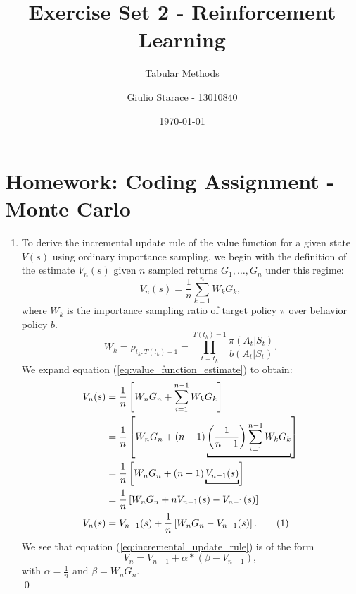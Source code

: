 \documentclass{article}
\title{Exercise Set 2 - Reinforcement Learning}
\subtitle{Tabular Methods}
\author{Giulio Starace - 13010840}
\date{\today}
\newcommand\numberthis{\addtocounter{equation}{1}\tag{\theequation}}
\begin{document}
\maketitle
\section*{Homework: Coding Assignment - Monte Carlo}
\begin{enumerate}
	\item To derive the incremental update rule of the value function for a given state $V(s)$ using
	      ordinary importance sampling, we begin with the definition of the estimate $V_n(s)$ given $n$
	      sampled returns $G_1, \dots, G_n$ under this regime:
	      \begin{equation}\label{eq:value_function_estimate}
		      V_n(s) = \frac{1}{n} \sum^n_{k=1} W_k G_k,
	      \end{equation}
	      where $W_k$ is the importance sampling ratio of target policy $\pi$ over behavior policy $b$.
	      \begin{equation}
		      W_k = \rho_{t_k:T(t_k)-1} = \prod_{t=t_k}^{T(t_k)-1} \frac{\pi(A_t|S_t)}{b(A_t|S_t)}.
	      \end{equation}
	      We expand equation (\ref{eq:value_function_estimate}) to obtain:
	      \begin{align*}
		      V_n(s) & = \frac{1}{n} \left[W_{n} G_{n} + \sum^{n-1}_{i=1}W_kG_k\right]                \\
		             & = \frac{1}{n} \left[W_{n} G_{n} +
		      (n-1)\underbracket{\left(\frac{1}{n-1}\right)\sum^{n-1}_{i=1}W_kG_k}\right]             \\
		             & =  \frac{1}{n} \left[W_{n} G_{n}+ (n-1)\underbracket{V_{n-1}(s)} \right]       \\
		             & = \frac{1}{n} \left[W_{n} G_{n}+ n V_{n-1}(s) - V_{n-1}(s)\right]              \\
		      V_n(s) & =  V_{n-1}(s) + \frac{1}{n} \left[W_{n} G_{n} - V_{n-1}(s)\right]. \numberthis
		      \label{eq:incremental_update_rule}
	      \end{align*}
	      We see that equation (\ref{eq:incremental_update_rule}) is of the form
	      \begin{equation}
		      V_n = V_{n-1} + \alpha * \left(\beta - V_{n-1}\right),
	      \end{equation}
	      with $\alpha = \frac{1}{n}$ and $\beta = W_{n} G_{n}$.  \\ \qed


\end{enumerate}
\end{document}
